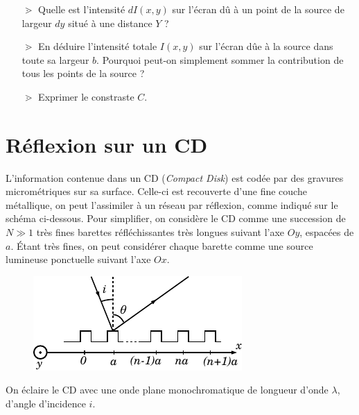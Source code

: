 \documentclass{report}
\begin{document}
\begin{itemize}

	\item[$\gtrdot$] Quelle est l'intensité $dI(x,y)$ sur l'écran dû à un point de la source de largeur $dy$ situé à une distance $Y$ ?
	
	\item[$\gtrdot$] En déduire l'intensité totale $I(x,y)$ sur l'écran dûe à la source dans toute sa largeur $b$. Pourquoi peut-on simplement sommer la contribution de tous les points de la source ?
	
	\item[$\gtrdot$] Exprimer le constraste $C$.

\end{itemize}

\newpage

\section*{Réflexion sur un CD}

L'information contenue dans un CD (\textit{Compact Disk}) est codée par des gravures micrométriques sur sa surface. Celle-ci est recouverte d'une fine couche métallique, on peut l'assimiler à un réseau par réflexion, comme indiqué sur le schéma ci-dessous. Pour simplifier, on considère le CD comme une succession de $N\gg1$ très fines barettes réfléchissantes très longues suivant l'axe $Oy$, espacées de $a$. \'Etant très fines, on peut considérer chaque barette comme une source lumineuse ponctuelle suivant l'axe $Ox$. 

\begin{figure}[h]
\centering
  \includegraphics[scale=1.9]{CD.pdf}
\end{figure}

On éclaire le CD avec une onde plane monochromatique de longueur d'onde $\lambda$, d'angle d'incidence $i$.
\end{document}
